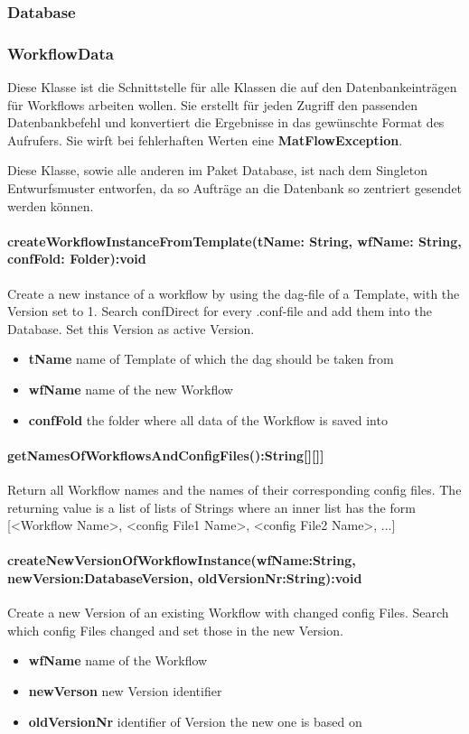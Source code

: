 \subsubsection{\label{database} Database}

\subsubsection{WorkflowData}
Diese Klasse ist die Schnittstelle für alle Klassen die auf den Datenbankeinträgen für Workflows arbeiten wollen. Sie erstellt für jeden Zugriff den passenden Datenbankbefehl und konvertiert die Ergebnisse in das gewünschte Format des Aufrufers.
Sie wirft bei fehlerhaften Werten eine \textbf{MatFlowException}.

Diese Klasse, sowie alle anderen im Paket Database, ist nach dem Singleton Entwurfsmuster entworfen, da so Aufträge an die Datenbank so zentriert gesendet werden können.

\paragraph{createWorkflowInstanceFromTemplate(tName: String, wfName: String, confFold: Folder):void}
Create a new instance of a workflow by using the dag-file of a Template, 
with the Version set to 1. 
Search confDirect for every .conf-file and add them into the Database.
Set this Version as active Version.
\begin{itemize}
	\item \textbf{tName}
	name of Template of which the dag should be taken from
	\item \textbf{wfName}
	name of the new Workflow
	\item \textbf{confFold}
	the folder where all data of the Workflow is saved into
\end{itemize}


\paragraph{getNamesOfWorkflowsAndConfigFiles():String[][]]}
Return all Workflow names and the names of their corresponding config files.
The returning value is a list of lists of Strings where an inner list has the form [<Workflow Name>, <config File1 Name>, <config File2 Name>, ...]

\paragraph{createNewVersionOfWorkflowInstance(wfName:String, newVersion:DatabaseVersion, oldVersionNr:String):void}
Create a new Version of an existing Workflow with changed config Files.
Search which config Files changed and set those in the new Version.
\begin{itemize}
	\item \textbf{wfName}
	name of the Workflow
	\item \textbf{newVerson}
	new Version identifier
	\item \textbf{oldVersionNr}
	identifier of Version the new one is based on
\end{itemize}

